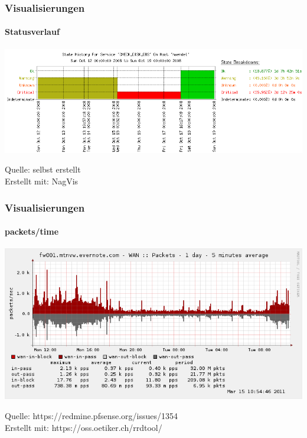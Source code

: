 \begin{frame}
\end{frame}

\begin{frame}
\frametitle{Visualisierungen}
\framesubtitle{Statusverlauf}

    \includegraphics[scale=0.45]{img/nag_trend.png}
    \vspace{0.5cm}
    
    \footnoterule
    \footnotesize{
        Quelle:          selbst erstellt\\
        Erstellt mit:    NagVis}

\end{frame}
\begin{frame}
\frametitle{Visualisierungen}
\framesubtitle{packets/time}

\includegraphics[scale=0.4]{img/status_rrd_graph_img.png}
\vspace{0.5cm}

\footnoterule
\footnotesize{
   Quelle:          https://redmine.pfsense.org/issues/1354\\
   Erstellt mit:    https://oss.oetiker.ch/rrdtool/}


\end{frame}